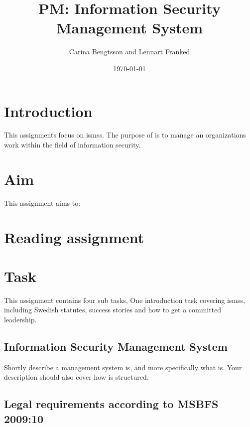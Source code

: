 \documentclass[a4paper]{llncs}
\begin{document}
\title{PM\@: Information Security Management System}
\author{%
  Carina Bengtsson and Lennart Franked
}
\date{\today}

\maketitle


\section{Introduction}
\label{sec:introduction}

This assignments focus on \acp{isms}. The purpose of  is to manage
an organizations work within the field of information security.

\section{Aim}
\label{sec:aim}

This assignment aims to:
\begin{itemize}
  
\end{itemize}


\section{Reading assignment}




\section{Task}\label{Work}

This assignment contains four sub tasks, One introduction task covering
\acp{isms}, including Swedish statutes, success stories and how to get a
committed leadership.

\subsection{Information Security Management System}
Shortly describe a management system is, and more specifically what  
is. Your description should also cover how  is
structured.

\subsection{Legal requirements according to MSBFS 2009:10}
\end{document}
